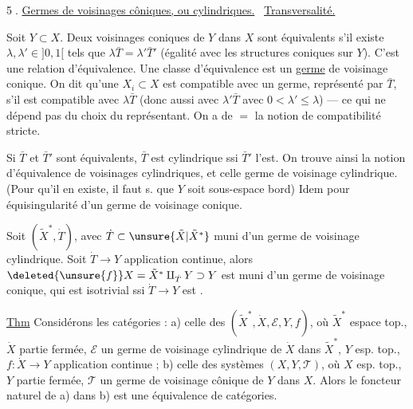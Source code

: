 \textcircled{5.}
\uline{Germes de voisinages côniques, ou cylindriques.}
\ \uline{Transversalité.}

Soit $Y\subset X$. Deux voisinages coniques
 de $Y$ dans
$X$ sont équivalents s'il existe $\lambda,\lambda'\in]0,1[$ tels
que $\lambda\bar T=\lambda'\bar T'$ (égalité 
avec les structures
coniques sur $Y$). C'est une relation d'équivalence.
\margin{$\varepsilon\in]0,1[$, alors pour
$\varepsilon\lambda\bar T=\varepsilon\lambda'\bar T'$}
Une classe d'équivalence est un \uline{germe} de
voisinage conique. On dit qu'une $X_i\subset X$
est compatible avec un germe, représenté par $\bar T$,
s'il est \inserted{$\exists\lambda\in]0,1[$ \deleted{\unsure{telle}}
tel qu'il soit} compatible avec $\lambda\bar T$
(donc aussi avec $\lambda'\bar T$
avec $0<\lambda'\leq\lambda$) --- ce qui ne dépend pas du
choix du représentant. On a de $=$ la
notion de compatibilité stricte.

Si $\bar T$ et $\bar T'$ sont équivalents, 
$\bar T$ est
cylindrique ssi $\bar T'$ l'est. On trouve ainsi la notion
d'équivalence de voisinages cylindriques, et celle 
germe de voisinage cylindrique. (Pour qu'il
en existe, il faut s. que $Y$ soit sous-espace bord)
Idem pour équisingularité d'un germe de
voisinage conique.

Soit $(\tilde X^*,\dot T)$, avec $\dot T\subset\unsure{\tilde X|\tilde X^*}$ muni d'un
germe de voisinage cylindrique. Soit $\dot T\longrightarrow Y$
application continue, alors
$\deleted{\unsure{f}}X=\tilde X^*\amalg_{\dot T}Y\supset Y$
est muni d'un germe de voisinage  conique,
qui est isotrivial ssi $\dot T\longrightarrow Y$ est .

\uline{Thm} Considérons les  catégories  :
a) celle des 
$(\widetilde X^*,\dot X,\mathcal E,Y,f)$, où
$\widetilde X^*$ espace top., $\dot X$ partie fermée, $\mathcal E$ un germe
de voisinage cylindrique de $\dot X$ dans $\widetilde X^*$,
$Y$ esp. top., $f:\dot X\longrightarrow Y$ application continue ;
b) celle des systèmes $(X,Y,\mathcal T)$, où
$X$ esp. top., $Y$ partie fermée, $\mathcal T$ un germe
de voisinage cônique de $Y$ dans $X$. 
 Alors le foncteur naturel  de a)
dans b) est une équivalence de catégories.

